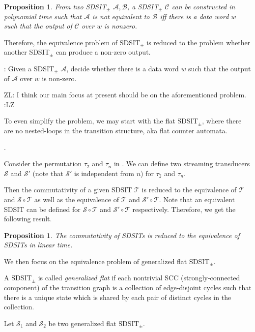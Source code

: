 \documentclass[11pt]{article}
\newtheorem{proposition}[theorem]{Proposition}
\def\Aa{{\mathscr{A} }}
\def\Bb{{\mathscr{B} }}
\def\Cc{{\mathscr{C} }}
\def\Ss{{\mathcal{S} }}
\def\Tt{{\mathcal{T} }}
\newcommand{\zhilin}[1]{\color{cyan} {ZL: #1 :LZ} \color{black}}
\begin{document}
\begin{proposition}
From two SDSIT$_{\pm}$ $\Aa,\Bb$, a SDSIT$_{\pm}$ $\Cc$ can be constructed in polynomial time such that $\Aa$ is not equivalent to $\Bb$ iff there is a data word $w$ such that the output of $\Cc$ over $w$ is nonzero. 
\end{proposition}

Therefore, the equivalence problem of SDSIT$_{\pm}$ is reduced to the problem whether another SDSIT$_{\pm}$ can produce a non-zero output.

\medskip

: Given a SDSIT$_{\pm}$ $\Aa$, decide whether there is a data word $w$ such that the output of $\Aa$ over $w$ is non-zero. 

\medskip

\zhilin{I think our main focus at present should be on the aforementioned problem.}

To even simplify the problem, we may start with the flat SDSIT$_{\pm}$, where there are no nested-loops in the transition structure, aka flat counter automata.

.

Consider the permutation $\tau_2$ and $\tau_n$ in \cite{CHSW15}. We can define two streaming transducers $\Ss$ and $\Ss'$ (note that $\Ss'$ is independent from $n$)  for $\tau_2$ and $\tau_n$.

Then the commutativity of a given SDSIT $\Tt$ is reduced to the equivalence of $\Tt$ and $\Ss \circ \Tt$ as well as the equivalence of $\Tt$ and $\Ss'\circ \Tt$. Note that an equivalent SDSIT can be defined for $\Ss \circ \Tt$ and $\Ss' \circ \Tt$ respectively. Therefore, we get the following result.

\begin{proposition}
The commutativity of SDSITs is reduced to the equivalence of SDSITs in linear time.
\end{proposition}

We then focus on the equivalence problem of generalized flat SDSIT$_{\pm}$.

A SDSIT$_{\pm}$ is called \emph{generalized flat} if each nontrivial SCC (strongly-connected component) of the transition graph is a collection of edge-disjoint cycles such that there is a unique state which is shared by each pair of distinct cycles in the collection.

Let $\Ss_1$ and $\Ss_2$ be two generalized flat SDSIT$_{\pm}$.
\end{document}
